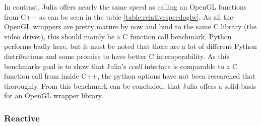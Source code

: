 In contrast, Julia offers nearly the same speed as calling an OpenGL functions from C++ as can be seen in the table \ref{table:relativespeedoglw}.
As all the OpenGL wrappers are pretty mature by now and bind to the same C library (the video driver), this should mainly be a C function call benchmark.
Python performs badly here, but it must be noted that there are a lot of different Python distributions and some promise to have better C interoperability.
As this benchmarks goal is to show that Julia’s \textit{ccall} interface is comparable to a C function call from inside C++, the python options have not been researched that thoroughly.
From this benchmark can be concluded, that Julia offers a solid basis for an OpenGL wrapper library.

\subsubsection{Reactive}


